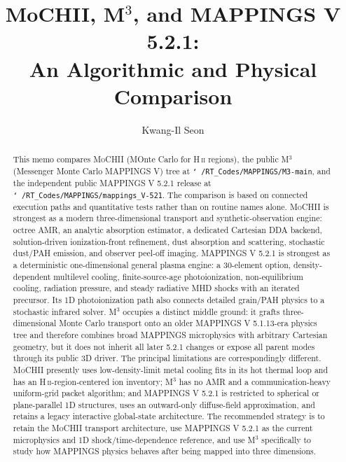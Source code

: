 \documentclass[english,a4paper]{my_memo}
\newcommand{\code}[1]{\texttt{#1}}
\newcommand{\MoCHII}{\textsc{MoCHII}}
\newcommand{\Mthree}{M$^3$}
\newcommand{\Mappings}{MAPPINGS V 5.2.1}
\newcommand{\HII}{H\,\textsc{ii}}
\begin{document}
\title{MoCHII, M$^3$, and MAPPINGS V 5.2.1:\\
An Algorithmic and Physical Comparison}
\author{Kwang-Il Seon}
\date{\docmoddate}
\maketitle

\begin{abstract}
This memo compares \MoCHII{} (MOnte Carlo for \HII{} regions), the public
\Mthree{} (Messenger Monte Carlo MAPPINGS V) tree at
\code{\char`~/RT\_Codes/MAPPINGS/M3-main}, and the independent public
\Mappings{} release at
\code{\char`~/RT\_Codes/MAPPINGS/mappings\_V-521}.  The comparison is
based on connected execution paths and quantitative tests rather than on
routine names alone.  \MoCHII{} is strongest as a modern
three-dimensional transport and synthetic-observation engine: octree AMR,
an analytic absorption estimator, a dedicated Cartesian DDA backend,
solution-driven ionization-front refinement, dust absorption and
scattering, stochastic dust/PAH emission, and observer peel-off imaging.
\Mappings{} is strongest as a deterministic one-dimensional general
plasma engine: a 30-element option, density-dependent multilevel cooling,
finite-source-age photoionization, non-equilibrium cooling, radiation
pressure, and steady radiative MHD shocks with an iterated precursor.
Its 1D photoionization path also connects detailed grain/PAH physics to a
stochastic infrared solver.  \Mthree{} occupies a distinct middle ground:
it grafts three-dimensional Monte Carlo transport onto an older MAPPINGS
V 5.1.13-era physics tree and therefore combines broad MAPPINGS
microphysics with arbitrary Cartesian geometry, but it does not inherit
all later 5.2.1 changes or expose all parent modes through its public 3D
driver.  The principal limitations are correspondingly different.
\MoCHII{} presently uses low-density-limit metal cooling fits in its hot
thermal loop and has an \HII-region-centered ion inventory; \Mthree{} has
no AMR and a communication-heavy uniform-grid packet algorithm; and
\Mappings{} is restricted to spherical or plane-parallel 1D structures,
uses an outward-only diffuse-field approximation, and retains a legacy
interactive global-state architecture.  The recommended strategy is to
retain the \MoCHII{} transport architecture, use \Mappings{} as the
current microphysics and 1D shock/time-dependence reference, and use
\Mthree{} specifically to study how MAPPINGS physics behaves after being
mapped into three dimensions.
\end{abstract}
\end{document}
